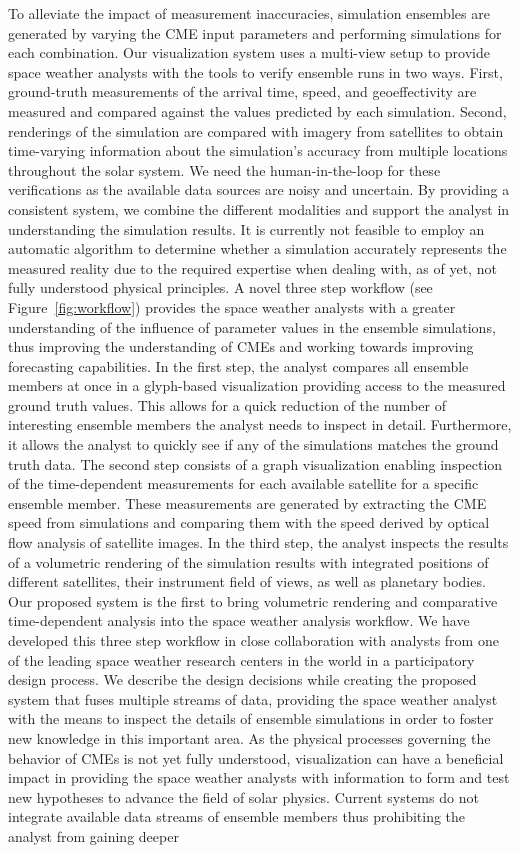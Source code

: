 \documentclass[journal]{vgtc}                %
\begin{document}
To alleviate the impact of measurement inaccuracies, simulation ensembles are generated by varying the CME input parameters and performing simulations for each combination. Our visualization system uses a multi-view setup to provide space weather analysts with the tools to verify ensemble runs in two ways. First, ground-truth measurements of the arrival time, speed, and geoeffectivity are measured and compared against the values predicted by each simulation. Second, renderings of the simulation are compared with imagery from satellites to obtain time-varying information about the simulation's accuracy from multiple locations throughout the solar system. We need the human-in-the-loop for these verifications as the available data sources are noisy and uncertain. By providing a consistent system, we combine the different modalities and support the analyst in understanding the simulation results. It is currently not feasible to employ an automatic algorithm to determine whether a simulation accurately represents the measured reality due to the required expertise when dealing with, as of yet, not fully understood physical principles. A novel three step workflow (see Figure~\ref{fig:workflow}) provides the space weather analysts with a greater understanding of the influence of parameter values in the ensemble simulations, thus improving the understanding of CMEs and working towards improving forecasting capabilities. In the first step, the analyst compares all ensemble members at once in a glyph-based visualization providing access to the measured ground truth values. This allows for a quick reduction of the number of interesting ensemble members the analyst needs to inspect in detail. Furthermore, it allows the analyst to quickly see if any of the simulations matches the ground truth data. The second step consists of a graph visualization enabling inspection of the time-dependent measurements for each available satellite for a specific ensemble member. These measurements are generated by extracting the CME speed from simulations and comparing them with the speed derived by optical flow analysis of satellite images. In the third step, the analyst inspects the results of a volumetric rendering of the simulation results with integrated positions of different satellites, their instrument field of views, as well as planetary bodies. Our proposed system is the first to bring volumetric rendering and comparative time-dependent analysis into the space weather analysis workflow. We have developed this three step workflow in close collaboration with analysts from one of the leading space weather research centers in the world in a participatory design process. We describe the design decisions while creating the proposed system that fuses multiple streams of data, providing the space weather analyst with the means to inspect the details of ensemble simulations in order to foster new knowledge in this important area. As the physical processes governing the behavior of CMEs is not yet fully understood, visualization can have a beneficial impact in providing the space weather analysts with information to form and test new hypotheses to advance the field of solar physics. Current systems do not integrate available data streams of ensemble members thus prohibiting the analyst from gaining deeper 
\end{document}
